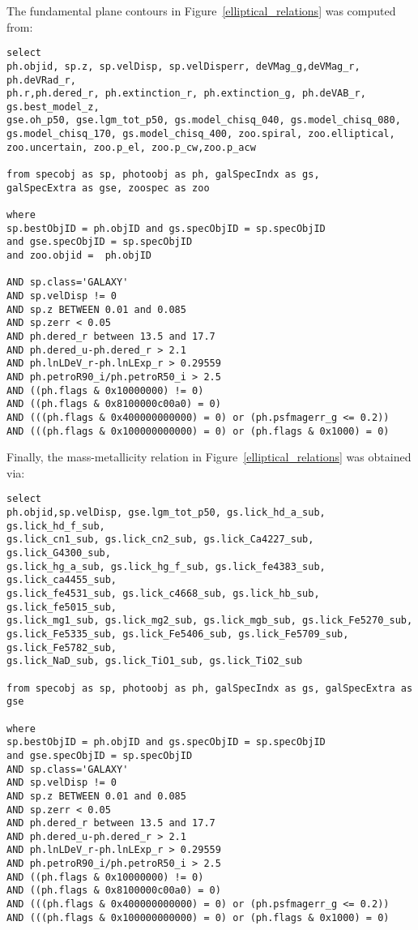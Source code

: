 \documentclass[12pt,preprint]{aastex}
\begin{document}
The fundamental plane contours in Figure~\ref{elliptical_relations} was computed from:
\begin{verbatim}
select
ph.objid, sp.z, sp.velDisp, sp.velDisperr, deVMag_g,deVMag_r, ph.deVRad_r, 
ph.r,ph.dered_r, ph.extinction_r, ph.extinction_g, ph.deVAB_r,  gs.best_model_z, 
gse.oh_p50, gse.lgm_tot_p50, gs.model_chisq_040, gs.model_chisq_080, 
gs.model_chisq_170, gs.model_chisq_400, zoo.spiral, zoo.elliptical, 
zoo.uncertain, zoo.p_el, zoo.p_cw,zoo.p_acw 

from specobj as sp, photoobj as ph, galSpecIndx as gs, 
galSpecExtra as gse, zoospec as zoo

where
sp.bestObjID = ph.objID and gs.specObjID = sp.specObjID 
and gse.specObjID = sp.specObjID 
and zoo.objid =  ph.objID 

AND sp.class='GALAXY'
AND sp.velDisp != 0
AND sp.z BETWEEN 0.01 and 0.085
AND sp.zerr < 0.05
AND ph.dered_r between 13.5 and 17.7
AND ph.dered_u-ph.dered_r > 2.1
AND ph.lnLDeV_r-ph.lnLExp_r > 0.29559
AND ph.petroR90_i/ph.petroR50_i > 2.5
AND ((ph.flags & 0x10000000) != 0)
AND ((ph.flags & 0x8100000c00a0) = 0)
AND (((ph.flags & 0x400000000000) = 0) or (ph.psfmagerr_g <= 0.2))
AND (((ph.flags & 0x100000000000) = 0) or (ph.flags & 0x1000) = 0)
\end{verbatim}




Finally, the mass-metallicity relation in Figure~\ref{elliptical_relations} was obtained via:
\begin{verbatim}
select 
ph.objid,sp.velDisp, gse.lgm_tot_p50, gs.lick_hd_a_sub, gs.lick_hd_f_sub, 
gs.lick_cn1_sub, gs.lick_cn2_sub, gs.lick_Ca4227_sub, gs.lick_G4300_sub, 
gs.lick_hg_a_sub, gs.lick_hg_f_sub, gs.lick_fe4383_sub, gs.lick_ca4455_sub, 
gs.lick_fe4531_sub, gs.lick_c4668_sub, gs.lick_hb_sub, gs.lick_fe5015_sub, 
gs.lick_mg1_sub, gs.lick_mg2_sub, gs.lick_mgb_sub, gs.lick_Fe5270_sub, 
gs.lick_Fe5335_sub, gs.lick_Fe5406_sub, gs.lick_Fe5709_sub, gs.lick_Fe5782_sub, 
gs.lick_NaD_sub, gs.lick_TiO1_sub, gs.lick_TiO2_sub 

from specobj as sp, photoobj as ph, galSpecIndx as gs, galSpecExtra as gse

where
sp.bestObjID = ph.objID and gs.specObjID = sp.specObjID 
and gse.specObjID = sp.specObjID
AND sp.class='GALAXY'
AND sp.velDisp != 0
AND sp.z BETWEEN 0.01 and 0.085
AND sp.zerr < 0.05
AND ph.dered_r between 13.5 and 17.7
AND ph.dered_u-ph.dered_r > 2.1
AND ph.lnLDeV_r-ph.lnLExp_r > 0.29559
AND ph.petroR90_i/ph.petroR50_i > 2.5
AND ((ph.flags & 0x10000000) != 0)
AND ((ph.flags & 0x8100000c00a0) = 0)
AND (((ph.flags & 0x400000000000) = 0) or (ph.psfmagerr_g <= 0.2))
AND (((ph.flags & 0x100000000000) = 0) or (ph.flags & 0x1000) = 0)
\end{verbatim}
\end{document}
